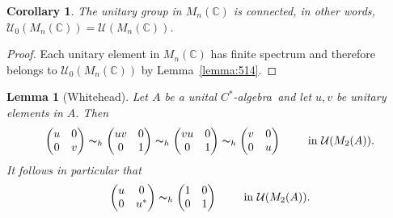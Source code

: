 \documentclass{book}
\newtheorem{lemma}[definition]{Lemma}
\newtheorem{corollary}[definition]{Corollary}
\def\cstar{\(C^*\)-algebra}
\begin{document}
\begin{corollary}
  The unitary group in \(M_n(\mathbb{C})\) is connected, in other words, \(\mathcal{U}_0(M_n(\mathbb{C})) = \mathcal{U}(M_n(\mathbb{C}))\).
\end{corollary}
\begin{proof}
  Each unitary element in \(M_n(\mathbb{C})\) has finite spectrum and therefore belongs to \(\mathcal{U}_0(M_n(\mathbb{C}))\) by Lemma~\ref{lemma:514}.
\end{proof}
\begin{lemma}[Whitehead]\label{lemma:516}
  Let \(A\) be a unital \cstar\ and let \(u, v\) be unitary elements in \(A\). Then
  \[
  \begin{pmatrix}
    u&0\\0&v
  \end{pmatrix}
  \thicksim_h
  \begin{pmatrix}
    uv&0\\0&1
  \end{pmatrix}
  \thicksim_h
  \begin{pmatrix}
    vu&0\\0&1
  \end{pmatrix}
  \thicksim_h
  \begin{pmatrix}
    v&0\\0&u
  \end{pmatrix}
  \qquad\mbox{ in }\mathcal{U}(M_2(A)).
  \]
  It follows in particular that
  \[
  \begin{pmatrix}
    u&0\\0&u^*
  \end{pmatrix}
  \thicksim_h
  \begin{pmatrix}
    1&0\\0&1
  \end{pmatrix}
  \qquad\mbox{ in }\mathcal{U}(M_2(A)).
  \]
\end{lemma}
\end{document}
